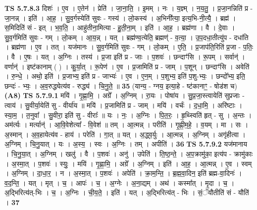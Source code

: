 \documentclass[17pt]{extarticle}
\begin{document}
                  \newline
                                \textbf{ TS 5.7.8.3} \newline
                  दिशः॑ । ए॒व । ए॒तेन॑ । प्रेति॑ । जा॒ना॒ति॒ । इ॒मम् । नः । य॒ज्ञ्म् । न॒य॒तु॒ । प्र॒जा॒नन्निति॑ प्र - जा॒नन्न् । इति॑ । आ॒ह॒ । सु॒व॒र्गस्येति॑ सुवः - गस्य॑ । लो॒कस्य॑ । अ॒भिनी᳚त्या॒ इत्य॒भि-नी॒त्यै॒ । ब्रह्म॑ । स॒मिदिति॑ सं - इत् । भ॒व॒ति॒ । आहु॑तीना॒मित्या - हु॒ती॒ना॒म् । इति॑ । आ॒ह॒ । ब्रह्म॑णा । वै । दे॒वाः । सु॒व॒र्गमिति॑ सुवः - गम् । लो॒कम् । आ॒य॒न्न् । यत् । ब्रह्म॑ण्व॒त्येति॒ ब्रह्मण्॑ - व॒त्या॒ । उ॒प॒दधा॒तीत्यु॑प - दधा॑ति । ब्रह्म॑णा । ए॒व । तत् । यज॑मानः । सु॒व॒र्गमिति॑ सुवः - गम् । लो॒कम् । ए॒ति॒ । प्र॒जाप॑ति॒रिति॑ प्र॒जा - प॒तिः॒ । वै । ए॒षः । यत् । अ॒ग्निः । तस्य॑ । प्र॒जा इति॑ प्र - जाः । प॒शवः॑ । छन्दाꣳ॑सि । रू॒पम् । सर्वान्॑ । वर्णान्॑ । इष्ट॑कानाम् ( ) । कु॒र्या॒त् । रू॒पेण॑ । ए॒व । प्र॒जामिति॑ प्र - जाम् । प॒शून् । छन्दाꣳ॑सि । अवेति॑ । रु॒न्धे॒ । अथो॒ इति॑ । प्र॒जाभ्य॒ इति॑ प्र - जाभ्यः॑ । ए॒व । ए॒न॒म् । प॒शुभ्य॒ इति॑ प॒शु-भ्यः॒ । छन्दो᳚भ्य॒ इति॒ छन्दः॑ - भ्यः॒ । अ॒व॒रुद्ध्येत्य॑व - रुद्ध्य॑ । चि॒नु॒ते॒ ॥ \textbf{  35} \newline
                  \newline
                      (यान्य॒ - ग्नय॒ इत्या॒हे - ष्ट॑कानाꣳ॒॒ - षोड॑श च)  \textbf{(A8)} \newline \newline
                                \textbf{ TS 5.7.9.1} \newline
                  मयि॑ । गृ॒ह्णा॒मि॒ । अग्रे᳚ । अ॒ग्निम् । रा॒यः । पोषा॑य । सु॒प्र॒जा॒स्त्वायेति॑ सुप्रजाः - त्वाय॑ । सु॒वीर्या॒येति॑ सु - वीर्या॑य ॥ मयि॑ । प्र॒जामिति॑ प्र - जाम् । मयि॑ । वर्चः॑ । द॒धा॒मि॒ । अरि॑ष्टाः । स्या॒म॒ । त॒नुवा᳚ । सु॒वीरा॒ इति॑ सु - वीराः᳚ ॥ यः । नः॒ । अ॒ग्निः । पि॒त॒रः॒ । हृ॒थ्स्विति॑ हृत् - सु । अ॒न्तः । अम॑र्त्यः । मर्त्यान्॑ । आ॒वि॒वेशेत्या᳚ - वि॒वेश॑ ॥ तम् । आ॒त्मन्न् । परीति॑ । गृ॒ह्णी॒म॒हे॒ । व॒यम् । मा । सः । अ॒स्मान् । अ॒व॒हायेत्य॑व - हाय॑ । परेति॑ । गा॒त् ॥ यत् । अ॒द्ध्व॒र्युः । आ॒त्मन्न् । अ॒ग्निम् । अगृ॑हीत्वा । अ॒ग्निम् । चि॒नु॒यात् । यः । अ॒स्य॒ । स्वः । अ॒ग्निः । तम् । अपीति॑ । \textbf{  36} \newline
                  \newline
                                \textbf{ TS 5.7.9.2} \newline
                  यज॑मानाय । चि॒नु॒या॒त् । अ॒ग्निम् । खलु॑ । वै । प॒शवः॑ । अनु॑ । उपेति॑ । ति॒ष्ठ॒न्ते॒ । अ॒प॒क्रामु॑का॒ इत्य॑प - क्रामु॑काः । अ॒स्मा॒त् । प॒शवः॑ । स्युः॒ । मयि॑ । गृ॒ह्णा॒मि॒ । अग्रे᳚ । अ॒ग्निम् । इति॑ । आ॒ह॒ । आ॒त्मन्न् । ए॒व । स्वम् । अ॒ग्निम् । दा॒धा॒र॒ । न । अ॒स्मा॒त् । प॒शवः॑ । अपेति॑ । क्रा॒म॒न्ति॒ । ब्र॒ह्म॒वा॒दिन॒ इति॑ ब्रह्म-वा॒दिनः॑ । व॒द॒न्ति॒ । यत् । मृत् । च॒ । आपः॑ । च॒ । अ॒ग्नेः । अ॒ना॒द्यम् । अथ॑ । कस्मा᳚त् । मृ॒दा । च॒ । अ॒द्भिरित्य॑त्-भिः । च॒ । अ॒ग्निः । ची॒य॒ते॒ । इति॑ । यत् । अ॒द्भिरित्य॑त् - भिः । सं॒ॅयौतीति॑ सं - यौति॑ । \textbf{  37} \newline
\end{document}
